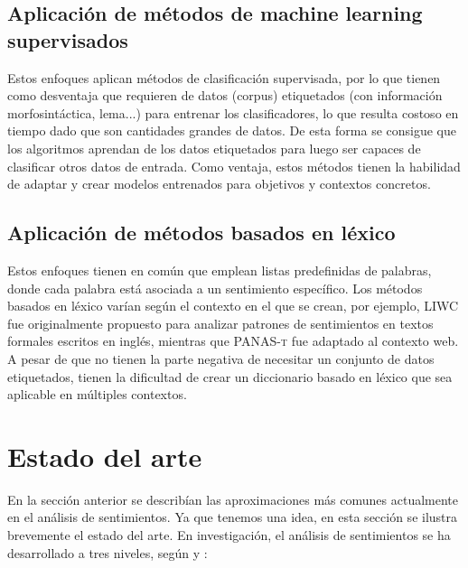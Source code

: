 \subsection{Aplicación de métodos de machine learning supervisados}
Estos enfoques aplican métodos de clasificación supervisada, por lo que tienen como desventaja que requieren de datos (corpus) etiquetados (con información morfosintáctica, lema...) para entrenar los clasificadores, lo que resulta costoso en tiempo dado que son cantidades grandes de datos.\newline
De esta forma se consigue que los algoritmos aprendan de los datos etiquetados para luego ser capaces de clasificar otros datos de entrada. Como ventaja, estos métodos tienen la habilidad de adaptar y crear modelos entrenados para objetivos y contextos concretos.  
\subsection{Aplicación de métodos basados en léxico}
Estos enfoques tienen en común que emplean listas predefinidas de palabras, donde cada palabra está asociada a un sentimiento específico. Los métodos basados en léxico varían según el contexto en el que se crean, por ejemplo, \textsc{LIWC} \citet{tausczik2010psychological} fue originalmente propuesto para analizar patrones de sentimientos en textos formales escritos en inglés, mientras que \textsc{PANAS-t} \citet{gonccalves2013panas} fue adaptado al contexto web.\newline
A pesar de que no tienen la parte negativa de necesitar un conjunto de datos etiquetados, tienen la dificultad de crear un diccionario basado en léxico que sea aplicable en múltiples contextos. 
\section{Estado del arte}
En la sección anterior se describían las aproximaciones más comunes actualmente en el análisis de sentimientos. Ya que tenemos una idea, en esta sección se ilustra brevemente el estado del arte.\newline
En investigación, el análisis de sentimientos se ha desarrollado a tres niveles, según  \citet{9781107017894} y \citet{westerski2007sentiment} :
